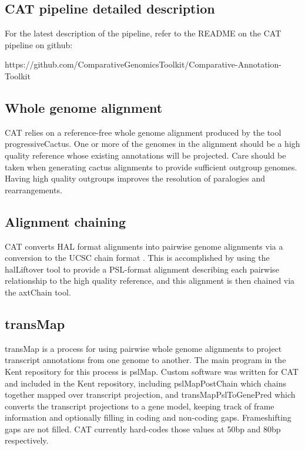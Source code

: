 \documentclass[fleqn,10pt]{wlscirep}
\begin{document}
\subsection{CAT pipeline detailed description}
For the latest description of the pipeline, refer to the README on the CAT pipeline on github: 

https://github.com/ComparativeGenomicsToolkit/Comparative-Annotation-Toolkit

\subsection{Whole genome alignment}
	CAT relies on a reference-free whole genome alignment produced by the tool progressiveCactus. One or more of the genomes in the alignment should be a high quality reference whose existing annotations will be projected. Care should be taken when generating cactus alignments to provide sufficient outgroup genomes. Having high quality outgroups improves the resolution of paralogies and rearrangements.

\subsection{Alignment chaining}
	CAT converts HAL format alignments into pairwise genome alignments via a conversion to the UCSC chain format \cite{kent2003evolution}. This is accomplished by using the halLiftover tool to provide a PSL-format alignment describing each pairwise relationship to the high quality reference, and this alignment is then chained via the axtChain tool. 
    
\subsection{transMap}
	transMap \cite{stanke2008using,zhu2007comparative} is a process for using pairwise whole genome alignments to project transcript annotations from one genome to another. The main program in the Kent repository for this process is pslMap. Custom software was written for CAT and included in the Kent repository, including pslMapPostChain which chains together mapped over transcript projection, and transMapPslToGenePred which converts the transcript projections to a gene model, keeping track of frame information and optionally filling in coding and non-coding gaps. Frameshifting gaps are not filled. CAT currently hard-codes those values at 50bp and 80bp respectively.
    
\end{document}
